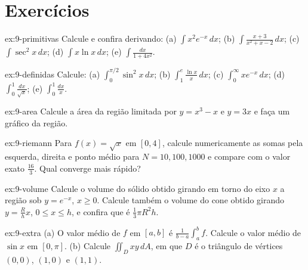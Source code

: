 \section{Exercícios}

\begin{exercicio}[primitivas]{ex:9-primitivas}
Calcule e confira derivando: (a) $\int x^2e^{-x}\,dx$; (b) $\int\frac{x+3}{x^2+x-2}\,dx$; (c) $\int\sec^2 x\,dx$;
(d) $\int x\ln x\,dx$; (e) $\int\frac{dx}{1+4x^2}$.
\end{exercicio}

\begin{exercicio}{ex:9-definidas}
Calcule: (a) $\int_0^{\pi/2}\sin^2x\,dx$; (b) $\int_1^e\frac{\ln x}{x}\,dx$; (c) $\int_0^\infty xe^{-x}\,dx$;
(d) $\int_0^1\frac{dx}{\sqrt x}$; (e) $\int_0^1 \frac{dx}{x}$.
\end{exercicio}

\begin{exercicio}[área]{ex:9-area}
Calcule a área da região limitada por $y=x^3-x$ e $y=3x$ e faça um gráfico da região.
\end{exercicio}

\begin{exercicio}[Riemann]{ex:9-riemann}
Para $f(x)=\sqrt{x}$ em $[0,4]$, calcule numericamente as somas pela esquerda, direita e ponto médio para
$N=10, 100, 1000$ e compare com o valor exato $\frac{16}{3}$. Qual converge mais rápido?
\end{exercicio}

\begin{exercicio}[volume]{ex:9-volume}
Calcule o volume do sólido obtido girando em torno do eixo $x$ a região sob $y=e^{-x}$, $x\ge0$. Calcule também
o volume do cone obtido girando $y=\frac{R}{h}x$, $0\le x\le h$, e confira que é $\frac13\pi R^2h$.
\end{exercicio}

\begin{exercicio}{ex:9-extra}
(a) O valor médio de $f$ em $[a,b]$ é $\frac{1}{b-a}\int_a^bf$. Calcule o valor médio de $\sin x$ em $[0,\pi]$.
(b) Calcule $\iint_D xy\,dA$, em que $D$ é o triângulo de vértices $(0,0)$, $(1,0)$ e $(1,1)$.
\end{exercicio}
